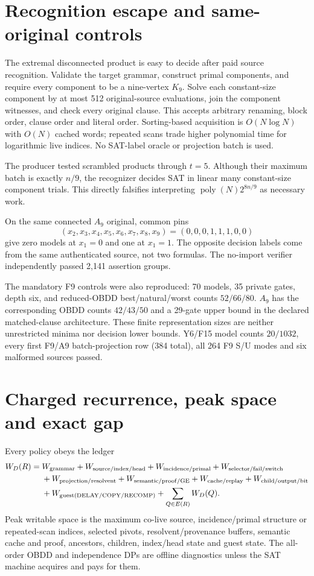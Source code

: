 \documentclass[11pt]{article}
\begin{document}
\section{Recognition escape and same-original controls}

The extremal disconnected product is easy to decide after paid source
recognition.  Validate the target grammar, construct primal components, and
require every component to be a nine-vertex $K_9$.  Solve each constant-size
component by at most 512 original-source evaluations, join the component
witnesses, and check every original clause.  This accepts arbitrary renaming,
block order, clause order and literal order.  Sorting-based acquisition is
$O(N\log N)$ with $O(N)$ cached words; repeated scans trade higher polynomial
time for logarithmic live indices.  No SAT-label oracle or projection batch is
used.

The producer tested scrambled products through $t=5$.  Although their maximum
batch is exactly $n/9$, the recognizer decides SAT in linear many constant-size
component trials.  This directly falsifies interpreting
$\operatorname{poly}(N)2^{8n/9}$ as necessary work.

On the same connected $A_9$ original, common pins
\[
(x_2,x_3,x_4,x_5,x_6,x_7,x_8,x_9)=(0,0,0,1,1,1,0,0)
\]
give zero models at $x_1=0$ and one at $x_1=1$.  The opposite decision labels
come from the same authenticated source, not two formulas.  The no-import
verifier independently passed 2,141 assertion groups.

The mandatory F9 controls were also reproduced: 70 models, 35 private gates,
depth six, and reduced-OBDD best/natural/worst counts $52/66/80$.  $A_9$ has
the corresponding OBDD counts $42/43/50$ and a 29-gate upper bound in the
declared matched-clause architecture.  These finite representation sizes are
neither unrestricted minima nor decision lower bounds.  Y6/F15 model counts
$20/1032$, every first F9/A9 batch-projection row (384 total), all 264 F9 S/U
modes and six malformed sources passed.

\section{Charged recurrence, peak space and exact gap}

Every policy obeys the ledger
\begin{align*}
W_D(R)={}&W_{\rm grammar}+W_{\rm source/index/head}
+W_{\rm incidence/primal}+W_{\rm selector/fail/switch}\\
&+W_{\rm projection/resolvent}+W_{\rm semantic/proof/GE}
+W_{\rm cache/replay}+W_{\rm child/output/bit}\\
&+W_{\rm guest(DELAY/COPY/RECOMP)}+\sum_{Q\in E(R)}W_D(Q).
\end{align*}
Peak writable space is the maximum co-live source, incidence/primal structure
or repeated-scan indices, selected pivots, resolvent/provenance buffers,
semantic cache and proof, ancestors, children, index/head state and guest
state.  The all-order OBDD and independence DPs are offline diagnostics unless
the SAT machine acquires and pays for them.
\end{document}
